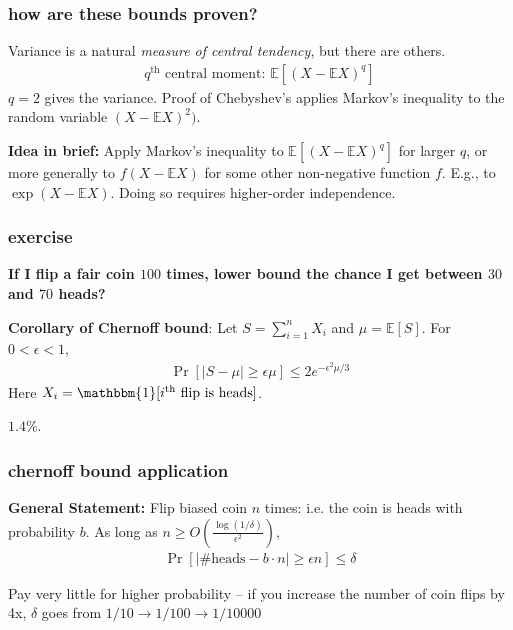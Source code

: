 \documentclass[compress]{beamer}
\newcommand{\E}{\mathbb{E}}
\begin{document}
\begin{frame}
	\frametitle{how are these bounds proven?}
	Variance is a natural \emph{measure of central tendency}, but there are others. 
	\begin{align*}
		q^\text{th} \text{ central moment: } \E[(X-\E X)^q]
	\end{align*}
	$q = 2$ gives the variance. Proof of Chebyshev's applies Markov's inequality to the random variable $(X - \E X)^2)$.
	
	\textbf{Idea in brief:} Apply Markov's inequality to $\E[(X-\E X)^q]$ for larger $q$, or more generally to $f(X-\E X)$ for some other non-negative function $f$. E.g., to $\exp(X-\E X)$. Doing so requires higher-order independence.
\end{frame}

\begin{frame}[t]
	\frametitle{exercise}
	\small 
	\begin{center}
		\textbf{If I flip a fair coin $100$ times, lower bound the chance I get between $30$ and $70$ heads?}
	\end{center}
	
		\textbf{Corollary of Chernoff bound}: Let $S = \sum_{i=1}^n X_i$ and $\mu = \E[S]$. For $0< \epsilon < 1$, 
	\vspace{-.75em}
	\begin{align*}
		\Pr[|S - \mu| \geq \epsilon \mu] \leq 2e^{-\epsilon^2 \mu/3}
	\end{align*} 
	Here $X_i = \mathbbm{1}[i^\text{th} \text{ flip is heads}]$. 
	\vspace{8em}
	
	$1.4\%$.
\end{frame}

\begin{frame}[t]
	\frametitle{chernoff bound application}
	\textbf{General Statement:} Flip biased coin $n$ times: i.e. the coin is heads with probability $b$. As long as $n \geq O\left(\frac{\log(1/\delta)}{\epsilon^2}\right)$,
	\vspace{-.5em}
	\begin{align*}
		\Pr[|\text{\# heads} - b\cdot n| \geq \epsilon n] \leq \delta 
	\end{align*}

	

	\vspace{10em}
		Pay very little for higher probability -- if you increase the number of coin flips by 4x, $\delta$ goes from $1/10 \rightarrow 1/100 \rightarrow 1/10000$
\end{frame}
\end{document}
